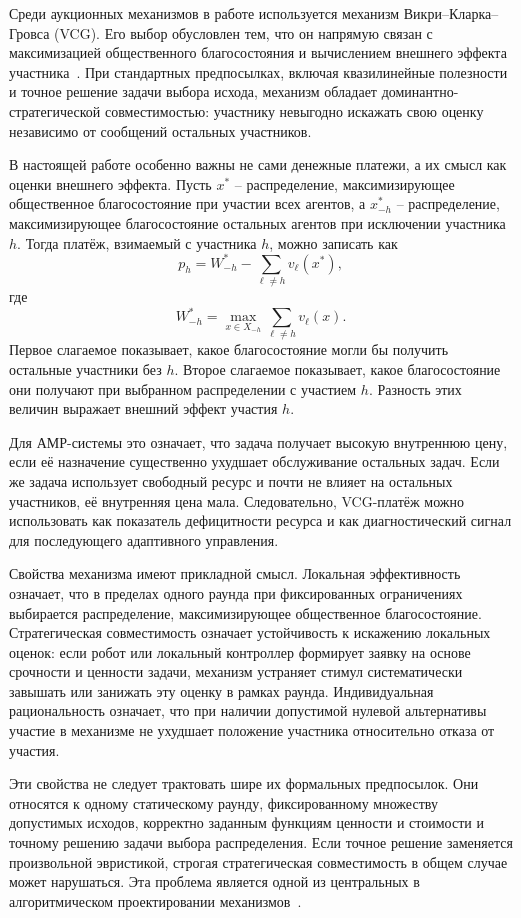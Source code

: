Среди аукционных механизмов в работе используется механизм Викри--Кларка--Гровса (VCG). Его выбор обусловлен тем, что он напрямую связан с максимизацией общественного благосостояния и вычислением внешнего эффекта участника~\cite{Vickrey1961Counterspeculation,Clarke1971MultipartPricing,Groves1973IncentivesTeams,Nisan2007AlgorithmicGameTheory}. При стандартных предпосылках, включая квазилинейные полезности и точное решение задачи выбора исхода, механизм обладает доминантно-стратегической совместимостью: участнику невыгодно искажать свою оценку независимо от сообщений остальных участников.

В настоящей работе особенно важны не сами денежные платежи, а их смысл как оценки внешнего эффекта. Пусть $x^*$ -- распределение, максимизирующее общественное благосостояние при участии всех агентов, а $x^*_{-h}$ -- распределение, максимизирующее благосостояние остальных агентов при исключении участника $h$. Тогда платёж, взимаемый с участника $h$, можно записать как
\[
p_h = W^*_{-h} - \sum_{\ell \neq h} v_\ell(x^*),
\]
где
\[
W^*_{-h} = \max_{x \in X_{-h}} \sum_{\ell \neq h} v_\ell(x).
\]
Первое слагаемое показывает, какое благосостояние могли бы получить остальные участники без $h$. Второе слагаемое показывает, какое благосостояние они получают при выбранном распределении с участием $h$. Разность этих величин выражает внешний эффект участия $h$.

Для АМР-системы это означает, что задача получает высокую внутреннюю цену, если её назначение существенно ухудшает обслуживание остальных задач. Если же задача использует свободный ресурс и почти не влияет на остальных участников, её внутренняя цена мала. Следовательно, VCG-платёж можно использовать как показатель дефицитности ресурса и как диагностический сигнал для последующего адаптивного управления.

Свойства механизма имеют прикладной смысл. Локальная эффективность означает, что в пределах одного раунда при фиксированных ограничениях выбирается распределение, максимизирующее общественное благосостояние. Стратегическая совместимость означает устойчивость к искажению локальных оценок: если робот или локальный контроллер формирует заявку на основе срочности и ценности задачи, механизм устраняет стимул систематически завышать или занижать эту оценку в рамках раунда. Индивидуальная рациональность означает, что при наличии допустимой нулевой альтернативы участие в механизме не ухудшает положение участника относительно отказа от участия.

Эти свойства не следует трактовать шире их формальных предпосылок. Они относятся к одному статическому раунду, фиксированному множеству допустимых исходов, корректно заданным функциям ценности и стоимости и точному решению задачи выбора распределения. Если точное решение заменяется произвольной эвристикой, строгая стратегическая совместимость в общем случае может нарушаться. Эта проблема является одной из центральных в алгоритмическом проектировании механизмов~\cite{NisanRonen2001AMD,Nisan2007AlgorithmicGameTheory}.

